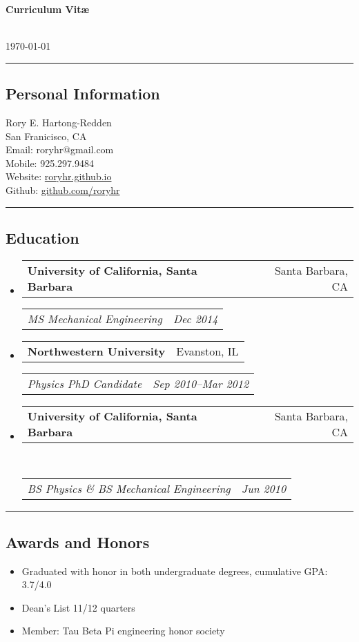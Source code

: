 \documentclass[10pt,letterpaper]{article}
\makeatletter
\newenvironment{indentsection}[1]%
{\begin{list}{}%
	{\setlength{\leftmargin}{#1}}%
	\item[]%
}
{\end{list}}
\newcommand{\headerrow}[2]
{\begin{tabular*}{\linewidth}{l@{\extracolsep{\fill}}r}
	#1 &
	#2 \\
\end{tabular*}}
\makeatother
\begin{document}
{\raggedright \LARGE \bf Curriculum Vit\ae}\\ \today
\newline
\hrule
\subsection*{Personal Information}
\begin{indentsection}{\parindent}
Rory E. Hartong-Redden \\
San Franicisco, CA   \\
Email: roryhr@gmail.com \\
Mobile: 925.297.9484 \\
Website: \href{roryhr.github.io}{roryhr.github.io} \\
Github: \href{https://github.com/roryhr}{github.com/roryhr}
\end{indentsection}

\hrule
\subsection*{Education}
\begin{itemize}
	\parskip=-0.1em
	\item 
	\headerrow
		{\textbf{University of California, Santa Barbara}}
		{Santa Barbara, CA}
	\headerrow
		{\emph{MS  Mechanical Engineering}}
		{\emph{Dec 2014}}
	\item 
	\headerrow
		{\textbf{Northwestern University}}{Evanston, IL}
	\headerrow
		{\emph{Physics PhD Candidate}}{\emph{Sep 2010--Mar 2012}}
	\item 
	\headerrow
		{\textbf{University of California, Santa Barbara}}
		{Santa Barbara, CA}	\\
	\headerrow
		{\emph{BS Physics \&  BS Mechanical Engineering}}
		{\emph{Jun 2010}}
\end{itemize}

\hrule
\subsection*{Awards and Honors}
\begin{indentsection}{\parindent}
	\begin{itemize}
		\parskip=-0.1em
		\item Graduated with honor in both undergraduate degrees, cumulative GPA: 3.7/4.0
		\item Dean's List 11/12 quarters
		\item Member: Tau Beta Pi engineering honor society
	\end{itemize}
\end{indentsection}
\end{document}
